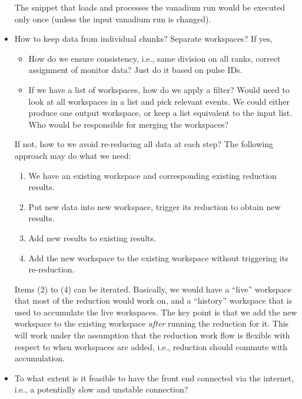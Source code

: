 \documentclass[a4paper,english,numbers=noenddot,bibliography=totoc,chapterprefix=on,DIV=12]{scrartcl}
\begin{document}
\begin{itemize}
    The snippet that loads and processes the vanadium run would be executed only once (unless the input vanadium run is changed).
  \item How to keep data from individual chunks?
    Separate workspaces?
    If yes,
    \begin{itemize}
      \item How do we ensure consistency, i.e., same division on all ranks, correct assignment of monitor data?
        Just do it based on pulse IDs.
      \item If we have a list of workspaces, how do we apply a filter?
        Would need to look at all workspaces in a list and pick relevant events.
        We could either produce one output workspace, or keep a list equivalent to the input list.
        Who would be responsible for merging the workspaces?
    \end{itemize}
    If not, how to we avoid re-reducing all data at each step?
    The following approach may do what we need:
    \begin{enumerate}
      \item We have an existing workspace and corresponding existing reduction results.
      \item Put new data into new workspace, trigger its reduction to obtain new results.
      \item Add new results to existing results.
      \item Add the new workspace to the existing workspace without triggering its re-reduction.
    \end{enumerate}
    Items (2) to (4) can be iterated.
    Basically, we would have a ``live'' workspace that most of the reduction would work on, and a ``history'' workspace that is used to accumulate the live workspaces.
    The key point is that we add the new workspace to the existing workspace \emph{after} running the reduction for it.
    This will work under the assumption that the reduction work flow is flexible with respect to when workspaces are added, i.e., reduction should commute with accumulation.
  \item To what extent is it feasible to have the front end connected via the internet, i.e., a potentially slow and unstable connection?
\end{itemize}




\end{document}

